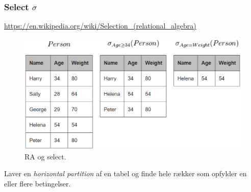 \subsubsection{Select $\sigma$}

\url{https://en.wikipedia.org/wiki/Selection_(relational_algebra)}\\

\begin{figure}[H]
	\centering
	\includegraphics[width=0.9\linewidth]{figs/spm6/select}
	\caption{RA og select.}
	\label{fig:select}
\end{figure}


Laver en \textit{horizontal partition} af en tabel og finde hele rækker som opfylder en eller flere betingelser.

%
%
%
%
%
%

